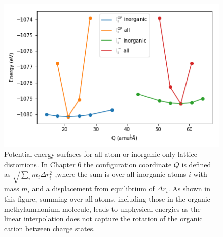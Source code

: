 \begin{figure}[h!]   
\centering
  \includegraphics[width=0.7\columnwidth]{figures/ap9/organic_inorganic.png}
  \caption[Potential energy surfaces for all-atom or inorganic-only lattice distortions]{Potential energy surfaces for all-atom or inorganic-only lattice distortions. In Chapter 6 the configuration coordinate $Q$ is defined as $\sqrt{\sum_i m_i \Delta r_i^2}$ ,where the sum is over all inorganic atoms $i$ with mass $m_i$ and a displacement from equilibrium of $\Delta r_i$. As shown in this figure, summing over all atoms, including those in the organic methylammonium molecule, leads to unphysical energies as the linear interpolation does not capture the rotation of the organic cation between charge states.}
\label{schrodinger}
\end{figure}
